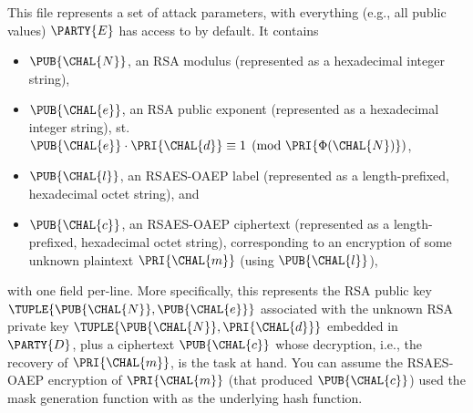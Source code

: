 \documentclass[crop={false},multi={true},tikz={true}]{standalone}
\begin{document}
This file represents a set of attack parameters, with everything (e.g.,
all public values) $\PARTY{E}$ has access to by default.  It contains 

\begin{itemize}
\item $\PUB{\CHAL{N}}$,     
      an RSA        modulus
      (represented as a                   hexadecimal integer string),
\item $\PUB{\CHAL{e}}$,
      an RSA        public exponent
      (represented as a                   hexadecimal integer string),
      st. $\PUB{\CHAL{e}} \cdot \PRI{\CHAL{d}} \equiv 1 \pmod{\PRI{\Phi{(\CHAL{N})}}}$,
\item $\PUB{\CHAL{l}}$,
      an RSAES-OAEP label
      (represented as a  length-prefixed, hexadecimal octet   string),
      and
\item $\PUB{\CHAL{c}}$,
      an RSAES-OAEP ciphertext 
      (represented as a  length-prefixed, hexadecimal octet   string),
      corresponding to an encryption of some unknown plaintext 
      $\PRI{\CHAL{m}}$ (using $\PUB{\CHAL{l}}$),
\end{itemize}

\noindent
with one field per-line.
More specifically, this represents the RSA public key 
$
\TUPLE{ \PUB{\CHAL{N}}, \PUB{\CHAL{e}} }
$
associated with the unknown RSA private key 
$
\TUPLE{ \PUB{\CHAL{N}}, \PRI{\CHAL{d}} } 
$
embedded in $\PARTY{D}$, 
plus a ciphertext $\PUB{\CHAL{c}}$ whose decryption, i.e., the recovery 
of $\PRI{\CHAL{m}}$, is the task at hand.  You can assume the RSAES-OAEP 
encryption of $\PRI{\CHAL{m}}$ (that produced $\PUB{\CHAL{c}}$) used the
 mask generation function with 
 as the underlying hash function.
%
\end{document}
